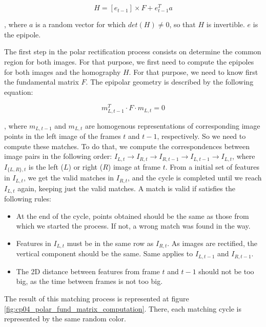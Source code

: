 \begin{equation}\label{eq:cp04_homography}
H = [e_{t - 1}] \times F + e_{t - 1}^T a
\end{equation}

, where $a$ is a random vector for which $det(H) \neq 0$, so that $H$ is invertible. $e$ is the epipole.

The first step in the polar rectification process consists on determine the common region for both images. For that purpose, we first need to compute the epipoles for both images and the homography $H$. For that purpose, we need to know first the fundamental matrix $F$. The epipolar geometry is described by the following equation:

\begin{equation}\label{eq:cp04_fundamental_matrix}
m_{L,t - 1}^T \cdot F \cdot m_{L,t}= 0
\end{equation}

, where $m_{L,t - 1}$ and $m_{L,t}$ are homogenous representations of corresponding image points in the left image of the frames $t$ and $t - 1$, respectively. So we need to compute these matches. To do that, we compute the correspondences between image pairs in the following order: $I_{L, t} \rightarrow I_{R, t} \rightarrow I_{R, t - 1} \rightarrow I_{L, t - 1} \rightarrow I_{L, t}$, where $I_{\{L,R\},t}$ is the left ($L$) or right ($R$) image at frame $t$. From a initial set of features in $I_{L, t}$, we get the valid matches in $I_{R, t}$, and the cycle is completed until we reach $I_{L, t}$ again, keeping just the valid matches. A match is valid if satisfies the following rules:
\begin{itemize}
 \item At the end of the cycle, points obtained should be the same as those from which we started the process. If not, a wrong match was found in the way.
 \item Features in $I_{L, t}$ must be in the same row as $I_{R, t}$. As images are rectified, the vertical component should be the same. Same applies to $I_{L, t - 1}$ and $I_{R, t - 1}$.
 \item The 2D distance between features from frame $t$ and $t - 1$ should not be too big, as the time between frames is not too big.
\end{itemize}

The result of this matching process is represented at figure \ref{fig:cp04_polar_fund_matrix_computation}. There, each matching cycle is represented by the same random color.


